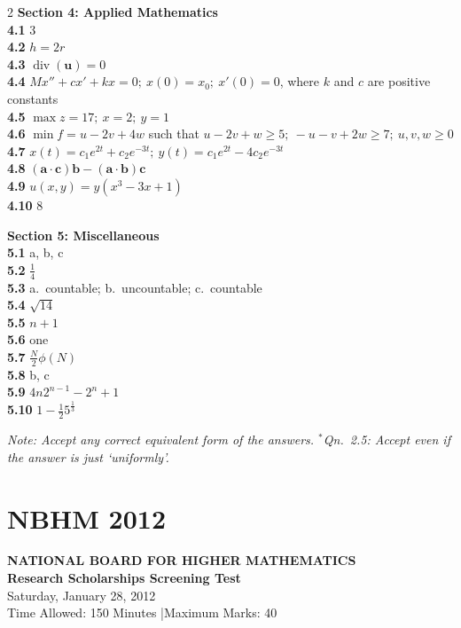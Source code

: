 \documentclass[11pt,a4paper]{article}
\newcommand{\divg}{\operatorname{div}}
\newcommand{\examheader}[4]{%
  \clearpage
  \section{#1}
  \begin{center}
    {\large\bfseries NATIONAL BOARD FOR HIGHER MATHEMATICS}\\[3pt]
    {\bfseries #2}\\[2pt]
    {#3}\\[2pt]
    {\small #4}
  \end{center}
  \vspace{4pt}
}
\begin{document}
\begin{multicols}{2}
\medskip
\textbf{Section 4: Applied Mathematics}\\
\textbf{4.1} $3$\\
\textbf{4.2} $h = 2r$\\
\textbf{4.3} $\divg(\mathbf{u}) = 0$\\
\textbf{4.4} $Mx'' + cx' + kx = 0;\ x(0) = x_0;\ x'(0) = 0$, where $k$ and $c$ are positive constants\\
\textbf{4.5} $\max z = 17;\ x = 2;\ y = 1$\\
\textbf{4.6} $\min f = u - 2v + 4w$ such that $u - 2v + w \ge 5;\ -u - v + 2w \ge 7;\ u, v, w \ge 0$\\
\textbf{4.7} $x(t) = c_1 e^{2t} + c_2 e^{-3t};\ y(t) = c_1 e^{2t} - 4c_2 e^{-3t}$\\
\textbf{4.8} $(\mathbf{a}\cdot\mathbf{c})\mathbf{b} - (\mathbf{a}\cdot\mathbf{b})\mathbf{c}$\\
\textbf{4.9} $u(x, y) = y(x^3 - 3x + 1)$\\
\textbf{4.10} $8$

\medskip
\textbf{Section 5: Miscellaneous}\\
\textbf{5.1} a, b, c\\
\textbf{5.2} $\frac{1}{4}$\\
\textbf{5.3} a.\ countable; b.\ uncountable; c.\ countable\\
\textbf{5.4} $\sqrt{14}$\\
\textbf{5.5} $n + 1$\\
\textbf{5.6} one\\
\textbf{5.7} $\frac{N}{2}\phi(N)$\\
\textbf{5.8} b, c\\
\textbf{5.9} $4n 2^{n-1} - 2^n + 1$\\
\textbf{5.10} $1 - \frac{1}{2}5^{\frac{1}{3}}$

\medskip
\noindent\emph{Note: Accept any correct equivalent form of the answers. $^*$Qn.\ 2.5: Accept even if the answer is just `uniformly'.}
\end{multicols}
\examheader{NBHM 2012}{Research Scholarships Screening Test}{Saturday, January 28, 2012}{Time Allowed: 150 Minutes \quad|\quad Maximum Marks: 40}
\end{document}
